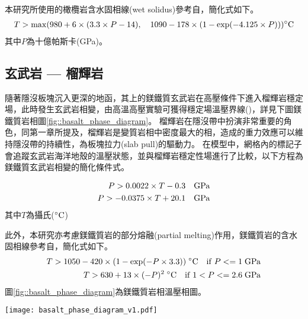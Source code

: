 本研究所使用的橄欖岩含水固相線(wet solidus)參考自\citet{katz2003new}，簡化式如下。
\begin{align}
    T > {\rm max} (980+6\times (3.3 \times P-14) ,\quad 1090-178\times(1-{\rm exp}(-4.125\times P))) {\rm ^\circ C}
\end{align}
其中$P$為十億帕斯卡(GPa)。

\subsection{玄武岩 --- 榴輝岩}

隨著隱沒板塊沉入更深的地函，其上的鎂鐵質玄武岩在高壓條件下進入榴輝岩穩定場，此時發生玄武岩相變，由高溫高壓實驗可獲得穩定場溫壓界線(\citealp{Hacker2003})，詳見下圖鎂鐵質岩相圖\ref{fig::basalt_phase_diagram}。
榴輝岩在隱沒帶中扮演非常重要的角色，同第一章所提及，榴輝岩是變質岩相中密度最大的相，造成的重力效應可以維持隱沒帶的持續性，為板塊拉力(slab pull)的驅動力。
在模型中，網格內的標記子會追蹤玄武岩海洋地殼的溫壓狀態，並與榴輝岩穩定性場進行了比較，以下方程為鎂鐵質玄武岩相變的簡化條件式。

\begin{align}
    P > 0.0022 \times T -0.3  \quad {\rm GPa}\\
    P > -0.0375 \times T + 20.1  \quad {\rm GPa}
\end{align}
其中$T$為攝氏(${\rm ^\circ C}$)

此外，本研究亦考慮鎂鐵質岩的部分熔融(partial melting)作用，鎂鐵質岩的含水固相線參考自\citet{Gutscher2000Bcan}，簡化式如下。
\begin{align}
    T > 1050-420 \times (1-{\rm exp}(-P\times 3.3)) \; {\rm ^\circ C} \quad {\rm if} \; P <= 1 \; {\rm GPa}\\
    T > 630 + 13 \times (-P)^2\; {\rm ^\circ C} \quad {\rm if} \; 1 < P <= 2.6 \; {\rm GPa}
\end{align}
圖\ref{fig::basalt_phase_diagram}為鎂鐵質岩相溫壓相圖。
\begin{figure*}[ht!]
    \centering
    \texttt{[image: basalt\_phase\_diagram\_v1.pdf]}
    \caption[鎂鐵質岩相圖，參考自\citet{Hacker2003}與\citet{Gutscher2000Bcan}]{鎂鐵質岩相圖，綠線隔開玄武岩與榴輝岩的穩定場，參考自\citet{Hacker2003}，橘線為鎂鐵質岩的含水固相線，參考自\citet{Gutscher2000Bcan}，綠虛線為外插值。}
    \label{fig::basalt_phase_diagram}
\end{figure*}

